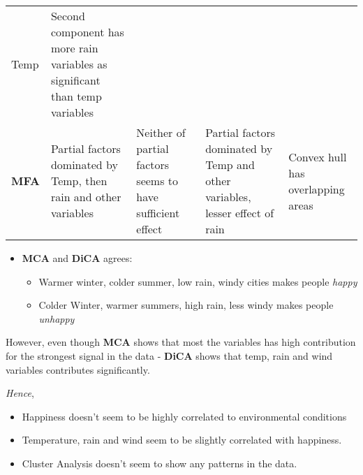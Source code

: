 \documentclass[]{book}
\providecommand{\tightlist}{%
  \setlength{\itemsep}{0pt}\setlength{\parskip}{0pt}}
\begin{document}
\begin{longtable}[]{@{}lllll@{}}
\begin{minipage}[t]{0.22\columnwidth}
Temp\strut
\end{minipage} & \begin{minipage}[t]{0.10\columnwidth}\raggedright
Second component has more rain variables as significant than temp
variables\strut
\end{minipage}\tabularnewline
\begin{minipage}[t]{0.15\columnwidth}\raggedright
\textbf{MFA}\strut
\end{minipage} & \begin{minipage}[t]{0.20\columnwidth}\raggedright
Partial factors dominated by Temp, then rain and other variables\strut
\end{minipage} & \begin{minipage}[t]{0.19\columnwidth}\raggedright
Neither of partial factors seems to have sufficient effect\strut
\end{minipage} & \begin{minipage}[t]{0.22\columnwidth}\raggedright
Partial factors dominated by Temp and other variables, lesser effect of
rain\strut
\end{minipage} & \begin{minipage}[t]{0.10\columnwidth}\raggedright
Convex hull has overlapping areas\strut
\end{minipage}\tabularnewline
\bottomrule
\end{longtable}

\begin{itemize}
\tightlist
\item
  \textbf{MCA} and \textbf{DiCA} agrees:

  \begin{itemize}
  \tightlist
  \item
    Warmer winter, colder summer, low rain, windy cities makes people
    \emph{happy}
  \item
    Colder Winter, warmer summers, high rain, less windy makes people
    \emph{unhappy}
  \end{itemize}
\end{itemize}

However, even though \textbf{MCA} shows that most the variables has high
contribution for the strongest signal in the data - \textbf{DiCA} shows
that temp, rain and wind variables contributes significantly.

\emph{Hence},

\begin{itemize}
\tightlist
\item
  Happiness doesn't seem to be highly correlated to environmental
  conditions
\item
  Temperature, rain and wind seem to be slightly correlated with
  happiness.
\item
  Cluster Analysis doesn't seem to show any patterns in the data.
\end{itemize}
\end{document}
